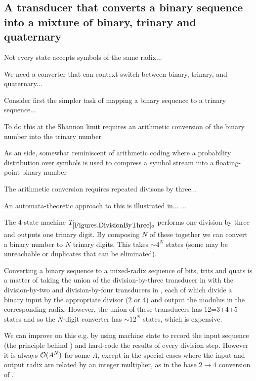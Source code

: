 \documentclass[english]{article}
\begin{document}
\subsection{A transducer that converts a binary sequence into a mixture of binary, trinary and quaternary}

Not every state accepts symbols of the same radix...

We need a converter that can context-switch between binary, trinary, and quaternary...

Consider first the simpler task of mapping a binary sequence to a trinary sequence...

To do this at the Shannon limit requires an arithmetic conversion of the binary number into the trinary number

As an side, somewhat reminiscent of arithmetic coding \cite{Mackay2003}
where a probability distribution over symbols is used to compress
a symbol stream into a floating-point binary number

The arithmetic conversion requires repeated divisons by three...

An automata-theoretic approach to this is illustrated in...
...

The 4-state machine $\transdivthree$ performs one division by three and outputs one trinary digit.
By composing $N$ of these together we can convert a binary number to $N$ trinary digits.
This takes $\sim 4^N$ states (some may be unreachable or duplicates that can be eliminated).

Converting a binary sequence to a mixed-radix sequence of bits, trits and quats
is a matter of taking the union of the division-by-three transducer
in 
with the division-by-two and division-by-four transducers
in ,
each of which divide a binary input by the appropriate divisor (2 or 4)
and output the modulus in the corresponding radix.
However, the union of these transducers has 12=3+4+5 states
and so the $N$-digit converter has $\sim 12^N$ states,
which is expensive.

We can improve on this e.g. by using machine state to record the input sequence
(the principle behind )
and hard-code the results of every division step.
However it is always ${\cal O}(A^N)$ for some $A$, except in the special cases where the input and output radix
are related by an integer multiplier, as in the base $2 \to 4$ conversion of .
\end{document}
